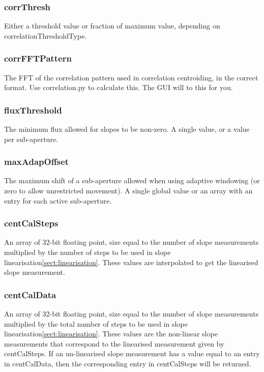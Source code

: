 \documentclass[a4,10pt]{article}
\begin{document}
\subsubsection{corrThresh}
Either a threshold value or fraction of maximum value, depending on
correlationThresholdType.

\subsubsection{corrFFTPattern}
The FFT of the correlation pattern used in correlation centroiding, in
the correct format.  Use correlation.py to calculate this.  The GUI
will to this for you.

\subsubsection{fluxThreshold}
The minimum flux allowed for slopes to be non-zero.  A single value,
or a value per sub-aperture.

\subsubsection{maxAdapOffset}
The maximum shift of a sub-aperture allowed when using adaptive
windowing (or zero to allow unrestricted movement).  A single global
value or an array with an entry for each active sub-aperture.



\subsubsection{centCalSteps}
An array of 32-bit floating point, size equal to the number of slope
measurements multiplied by the number of steps to be used in slope
linearisation\ref{sect:linearisation}.  These values are interpolated
to get the linearised slope measurement.

\subsubsection{centCalData}
An array of 32-bit floating point, size equal to the number of slope
measurements multiplied by the total number of steps to be used in
slope linearisation\ref{sect:linearisation}.  These values are the
non-linear slope measurements that correspond to the linearised
measurement given by centCalSteps.  If an un-linearised slope
measurement has a value equal to an entry in centCalData, then the
corresponding entry in centCalSteps will be returned.
\end{document}

